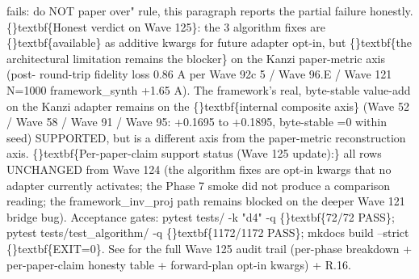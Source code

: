 \documentclass{article}
\begin{document}
fails: do NOT paper over" rule, this paragraph reports the partial failure honestly. \{\}textbf\{Honest verdict on Wave 125\}: the 3 algorithm fixes are \{\}textbf\{available\} as additive kwargs for future adapter opt-in, but \{\}textbf\{the architectural limitation remains the blocker\} on the Kanzi paper-metric axis (post- round-trip fidelity loss  0.86 A per Wave 92c 5 / Wave 96.E / Wave 121 N=1000 framework\_synth +1.65 A). The framework's real, byte-stable value-add on the Kanzi adapter remains on the \{\}textbf\{internal composite axis\} (Wave 52 / Wave 58 / Wave 91 / Wave 95: +0.1695 to +0.1895, byte-stable =0 within seed)  SUPPORTED, but is a different axis from the paper-metric reconstruction axis. \{\}textbf\{Per-paper-claim support status (Wave 125 update):\} all rows UNCHANGED from Wave 124 (the algorithm fixes are opt-in kwargs that no adapter currently activates; the Phase 7 smoke did not produce a comparison reading; the framework\_inv\_proj path remains blocked on the deeper Wave 121 bridge bug). Acceptance gates: pytest tests/ -k "d4" -q  \{\}textbf\{72/72 PASS\}; pytest tests/test\_algorithm/ -q  \{\}textbf\{1172/1172 PASS\}; mkdocs build --strict  \{\}textbf\{EXIT=0\}. See  for the full Wave 125 audit trail (per-phase breakdown + per-paper-claim honesty table + forward-plan opt-in kwargs) +  R.16.
\end{document}
